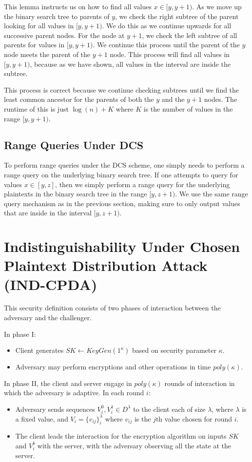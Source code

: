 \documentclass[12pt]{article}
\begin{document}
This lemma instructs us on how to find all values $x \in [y, y+1)$. As we move up the binary search tree to parents of $y$, we check the right subtree of the parent looking for all values in $[y, y+1)$. We do this as we continue upwards for all successive parent nodes. For the node at $y+1$, we check the left subtree of all parents for values in $[y, y+1)$. We continue this process until the parent of the $y$ node meets the parent of the $y+1$ node. This process will find all values in $[y, y+1)$, because as we have shown, all values in the interval are inside the subtree.

  This process is correct because we continue checking subtrees until we find the least common ancestor for the parents of both the $y$ and the $y+1$ nodes. The runtime of this is just $\log(n) + K$ where $K$ is the number of values in the range $[y, y+1)$.

  \subsection{Range Queries Under DCS}

  To perform range queries under the DCS scheme, one simply needs to perform a range query on the underlying binary search tree. If one attempts to query for values $x \in [y, z]$, then we simply perform a range query for the underlying plaintexts in the binary search tree in the range $[y, z+1)$. We use the same range query mechanism as in the previous section, making sure to only output values that are inside in the interval $[y, z+1)$.

\section{Indistinguishability Under Chosen Plaintext Distribution Attack (IND-CPDA)}

This security definition consists of two phases of interaction between the adversary and the challenger.

In phase I:
\begin{itemize}
  \item Client generates $SK \leftarrow KeyGen(1^\kappa)$ based on security parameter $\kappa$.
  \item Adversary may perform encryptions and other operations in time $poly(\kappa)$.
\end{itemize}

In phase II, the client and server engage in $poly(\kappa)$ rounds of interaction in which the adversary is adaptive. In each round $i$:
\begin{itemize}
  \item Adversary sends sequences $V_i^0, V_i^1 \in D^{\lambda}$ to the client each of size $\lambda$, where $\lambda$ is a fixed value, and $V_i = \{ v_{ij} \}_i^{\lambda}$ where $v_{ij}$ is the $j$th value chosen for round $i$.
  \item The client leads the interaction for the encryption algorithm on inputs $SK$ and $V_i^b$ with the server, with the adversary observing all the state at the server.
\end{itemize}
\end{document}
